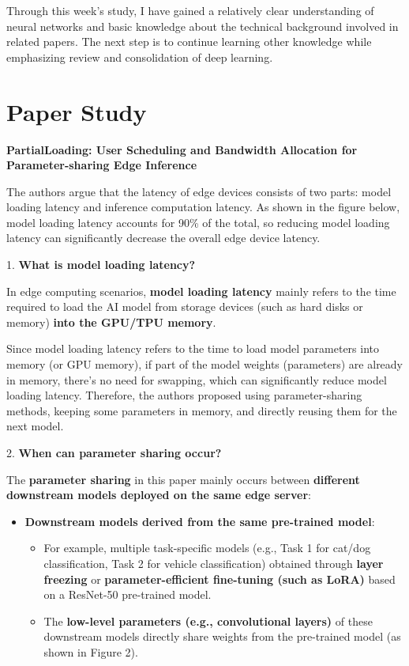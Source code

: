\documentclass[conference]{IEEEtran}
\begin{document}
\begin{CJK}{UTF8}{gbsn}
Through this week's study, I have gained a relatively clear understanding of neural networks and basic knowledge about the technical background involved in related papers. The next step is to continue learning other knowledge while emphasizing review and consolidation of deep learning.

\section{Paper Study}
\textbf{PartialLoading: User Scheduling and Bandwidth Allocation for Parameter-sharing Edge Inference}

The authors argue that the latency of edge devices consists of two parts: model loading latency and inference computation latency. As shown in the figure below, model loading latency accounts for 90\% of the total, so reducing model loading latency can significantly decrease the overall edge device latency.



1. \textbf{What is model loading latency?}

In edge computing scenarios, \textbf{model loading latency} mainly refers to the time required to load the AI model from storage devices (such as hard disks or memory) \textbf{into the GPU/TPU memory}.

Since model loading latency refers to the time to load model parameters into memory (or GPU memory), if part of the model weights (parameters) are already in memory, there's no need for swapping, which can significantly reduce model loading latency. Therefore, the authors proposed using parameter-sharing methods, keeping some parameters in memory, and directly reusing them for the next model.

2. \textbf{When can parameter sharing occur?}

The \textbf{parameter sharing} in this paper mainly occurs between \textbf{different downstream models deployed on the same edge server}:

\begin{itemize}
\item \textbf{Downstream models derived from the same pre-trained model}:
\begin{itemize}
\item For example, multiple task-specific models (e.g., Task 1 for cat/dog classification, Task 2 for vehicle classification) obtained through \textbf{layer freezing} or \textbf{parameter-efficient fine-tuning (such as LoRA)} based on a ResNet-50 pre-trained model.
\item The \textbf{low-level parameters (e.g., convolutional layers)} of these downstream models directly share weights from the pre-trained model (as shown in Figure 2).
\end{itemize}


\end{itemize}
\end{CJK}
\end{document}
